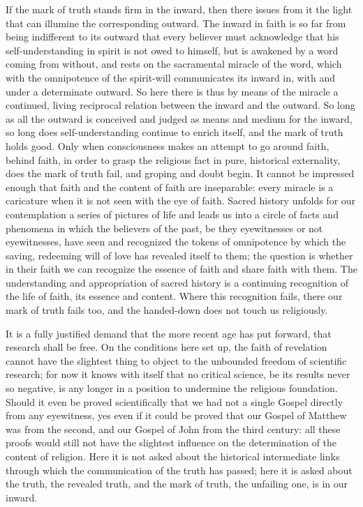 \documentclass[12pt,a4paper,openany]{book}
\newcommand{\opage}[1]{\marginnote{\footnotesize\textit{[#1]}}}
\begin{document}
If the mark of truth stands firm in the inward, then there issues
from it the light that can illumine the corresponding outward.
The inward in faith is so far from being indifferent to
its outward that every believer must acknowledge that his self-understanding
in spirit is not owed to himself, but is awakened by
a word coming from without, and rests on the sacramental
miracle of the word, which with the omnipotence of the spirit-will communicates its
inward in, with and under a determinate outward. So here there is
thus by means of the miracle a continued, living reciprocal relation
between the inward and the outward. So long as all the outward
is conceived and judged as means and medium for
the inward, so long does self-understanding continue to enrich itself,
and the mark of truth holds good. Only when consciousness
makes an attempt to go around faith, behind faith,
in order to grasp the religious fact in pure, historical
externality, does the mark of truth fail, and groping and doubt
begin. It cannot be impressed enough that faith and
the content of faith are inseparable: every miracle is a caricature
when it is not seen with the eye of faith. Sacred
history unfolds for our contemplation a series of
pictures of life and leads us into a circle of facts
and phenomena in which the believers of the past, be they
eyewitnesses or not eyewitnesses, have seen and recognized the
tokens of omnipotence by which the saving, redeeming will of love
has revealed itself to them; the question is
whether in their faith we can recognize the essence of faith and share
faith with them. The understanding and appropriation of sacred
\setcounter{footnote}{0}%
\opage{64}history is a continuing recognition of the life of faith,
its essence and content. Where this recognition
fails, there our mark of truth fails too, and the
handed-down does not touch us religiously.

It is a fully justified demand that the more recent age
has put forward, that research shall be free. On the conditions
here set up, the faith of revelation cannot have the
slightest thing to object to the unbounded
freedom of scientific research; for now it knows with itself that
no critical science, be its results never so negative,
is any longer in a position to undermine the religious foundation.
Should it even be proved scientifically that we had not
a single Gospel directly from any eyewitness, yes
even if it could be proved that our Gospel of Matthew
was from the second, and our Gospel of John from the
third century: all these proofs would still not
have the slightest influence on the determination of the content of
religion. Here it is not asked about the historical
intermediate links through which the communication of the truth has passed;
here it is asked about the truth, the revealed truth, and
the mark of truth, the unfailing one, is in our inward.
\end{document}
